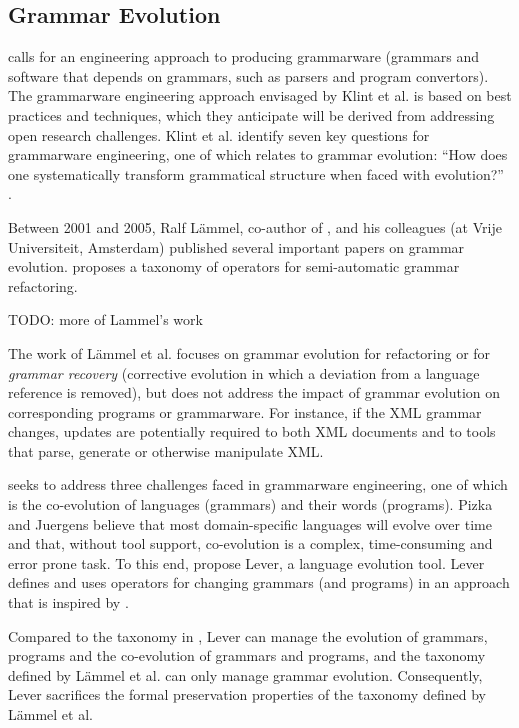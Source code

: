 \subsection{Grammar Evolution}
\cite{klint03grammarware} calls for an engineering approach to producing grammarware (grammars and software that depends on grammars, such as parsers and program convertors). The grammarware engineering approach envisaged by Klint et al. is based on best practices and techniques, which they anticipate will be derived from addressing open research challenges. Klint et al. identify seven key questions for grammarware engineering, one of which relates to grammar evolution: ``How does one systematically transform grammatical structure when faced with evolution?'' \cite[pg334]{klint03grammarware}.

Between 2001 and 2005, Ralf L\"{a}mmel, co-author of \cite{klint03grammarware}, and his colleagues (at Vrije Universiteit, Amsterdam) published several important papers on grammar evolution. \cite{lammel01grammar_adaptation} proposes a taxonomy of operators for semi-automatic grammar refactoring. 

TODO: more of Lammel's work

The work of L\"{a}mmel et al. focuses on grammar evolution for refactoring or for \emph{grammar recovery} (corrective evolution in which a deviation from a language reference is removed), but does not address the impact of grammar evolution on corresponding programs or grammarware. For instance, if the XML grammar changes, updates are potentially required to both XML documents and to tools that parse, generate or otherwise manipulate XML.

\cite{pizka07automating} seeks to address three challenges faced in grammarware engineering, one of which is the co-evolution of languages (grammars) and their words (programs). Pizka and Juergens believe that most domain-specific languages will evolve over time and that, without tool support, co-evolution is a complex, time-consuming and error prone task. To this end, \cite{pizka07automating} propose Lever, a language evolution tool. Lever defines and uses operators for changing grammars (and programs) in an approach that is inspired by \cite{lammel01grammar_adaptation}.

Compared to the taxonomy in \cite{lammel01grammar_adaptation}, Lever can manage the evolution of grammars, programs and the co-evolution of grammars and programs, and the taxonomy defined by L\"{a}mmel et al. can only manage grammar evolution. Consequently, Lever sacrifices the formal preservation properties of the taxonomy defined by L\"{a}mmel et al.


